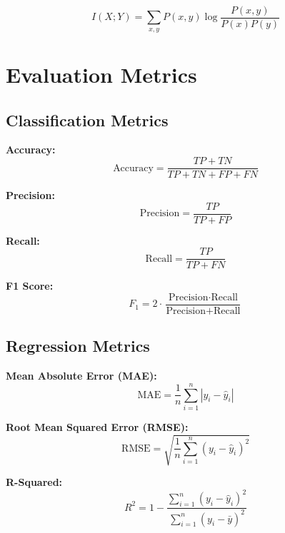 \begin{equation}
I(X;Y) = \sum_{x,y} P(x,y) \log\frac{P(x,y)}{P(x)P(y)}
\end{equation}

\section{Evaluation Metrics}

\subsection{Classification Metrics}

\textbf{Accuracy:}
\begin{equation}
\text{Accuracy} = \frac{TP + TN}{TP + TN + FP + FN}
\end{equation}

\textbf{Precision:}
\begin{equation}
\text{Precision} = \frac{TP}{TP + FP}
\end{equation}

\textbf{Recall:}
\begin{equation}
\text{Recall} = \frac{TP}{TP + FN}
\end{equation}

\textbf{F1 Score:}
\begin{equation}
F_1 = 2 \cdot \frac{\text{Precision} \cdot \text{Recall}}{\text{Precision} + \text{Recall}}
\end{equation}

\subsection{Regression Metrics}

\textbf{Mean Absolute Error (MAE):}
\begin{equation}
\text{MAE} = \frac{1}{n}\sum_{i=1}^{n}|y_i - \hat{y}_i|
\end{equation}

\textbf{Root Mean Squared Error (RMSE):}
\begin{equation}
\text{RMSE} = \sqrt{\frac{1}{n}\sum_{i=1}^{n}(y_i - \hat{y}_i)^2}
\end{equation}

\textbf{R-Squared:}
\begin{equation}
R^2 = 1 - \frac{\sum_{i=1}^{n}(y_i - \hat{y}_i)^2}{\sum_{i=1}^{n}(y_i - \bar{y})^2}
\end{equation}
